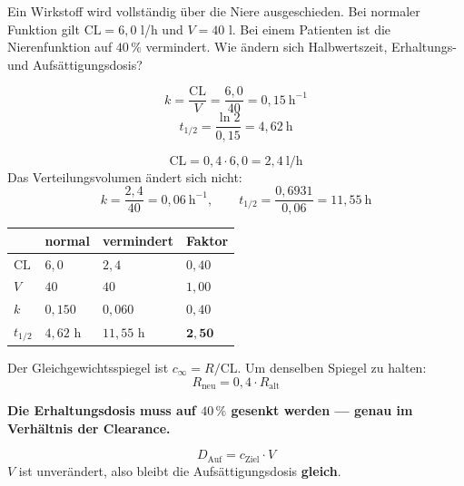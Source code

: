 \begin{aufgabe}
Ein Wirkstoff wird vollständig über die Niere ausgeschieden. Bei normaler Funktion gilt $\mathrm{CL} = 6{,}0$ l/h und $V = 40$ l. Bei einem Patienten ist die Nierenfunktion auf $40\,\%$ vermindert. Wie ändern sich Halbwertszeit, Erhaltungs- und Aufsättigungsdosis?

\loesung
{}
\[ k = \frac{\mathrm{CL}}{V} = \frac{6{,}0}{40} = 0{,}15\ \mathrm{h}^{-1} \]
\[ t_{1/2} = \frac{\ln 2}{0{,}15} = 4{,}62\ \mathrm{h} \]

\[ \mathrm{CL} = 0{,}4 \cdot 6{,}0 = 2{,}4\ \mathrm{l/h} \]
Das Verteilungsvolumen ändert sich nicht:
\[ k = \frac{2{,}4}{40} = 0{,}06\ \mathrm{h}^{-1}, \qquad t_{1/2} = \frac{0{,}6931}{0{,}06} = 11{,}55\ \mathrm{h} \]

\begin{center}
\renewcommand{\arraystretch}{1.48}
\begin{tabular}{@{}P{2.6cm}P{2.0cm}P{2.0cm}P{1.6cm}@{}}
\toprule
& \textbf{normal} & \textbf{vermindert} & \textbf{Faktor}\\
\midrule
$\mathrm{CL}$ & $6{,}0$ & $2{,}4$ & $0{,}40$\\
$V$ & $40$ & $40$ & $1{,}00$\\
$k$ & $0{,}150$ & $0{,}060$ & $0{,}40$\\
$t_{1/2}$ & $4{,}62$ h & $11{,}55$ h & $\mathbf{2{,}50}$\\
\bottomrule
\end{tabular}
\end{center}

Der Gleichgewichtsspiegel ist $c_\infty = R/\mathrm{CL}$. Um denselben Spiegel zu halten:
\[ R_{\text{neu}} = 0{,}4 \cdot R_{\text{alt}} \]

\begin{center}
\begin{minipage}{0.9\textwidth}
\textbf{Die Erhaltungsdosis muss auf $40\,\%$ gesenkt werden --- genau im Verhältnis der Clearance.}
\end{minipage}
\end{center}

\[ D_{\text{Auf}} = c_{\text{Ziel}}\cdot V \]
$V$ ist unverändert, also bleibt die Aufsättigungsdosis \textbf{gleich}.


\end{aufgabe}
